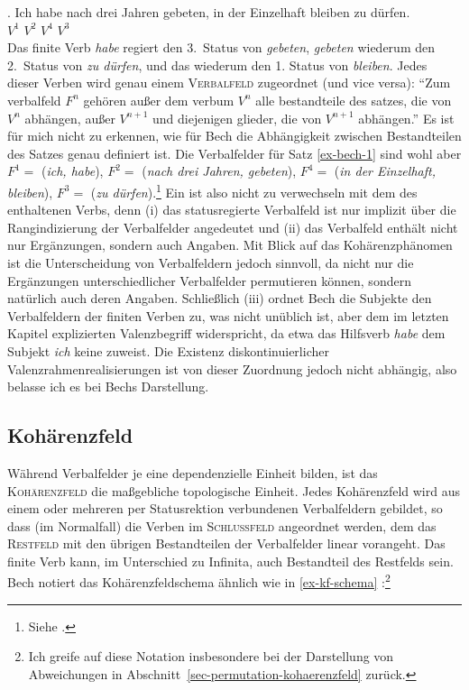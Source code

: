 \exg. Ich habe nach drei Jahren gebeten, in der Einzelhaft bleiben {zu dürfen}.\\
{} $V^1$ {} {} {} $V^2$ {} {} {} $V^4$ $V^3$\label{ex-bech-1}\\
 
Das finite Verb {\it habe} regiert den 3.~Status von {\it gebeten}, {\it gebeten} wiederum den 2.~Status von {\it zu dürfen}, und das wiederum den 1. Status von {\it bleiben}. Jedes dieser Verben wird genau einem \textsc{Verbalfeld} zugeordnet (und vice versa): "`Zum verbalfeld $F^n$ gehören au\ss er dem verbum $V^n$ alle bestandteile des satzes, die von $V^n$ abhängen, au\ss er $V^{n+1}$ und diejenigen glieder, die von $V^{n+1}$ abhängen."' \citep[\S 36]{Bech:55} Es ist für mich nicht zu erkennen, wie für Bech die Abhängigkeit zwischen Bestandteilen des Satzes genau definiert ist. Die Verbalfelder für Satz \ref{ex-bech-1} sind wohl aber $F^1 =$ ({\it ich, habe}), $F^2 =$ ({\it nach drei Jahren, gebeten}), $F^4 =$ ({\it in der Einzelhaft, bleiben}), $F^3 =$ ({\it zu dürfen}).\footnote{Siehe \citet[\S 22]{Bech:55}.} Ein  ist also nicht zu verwechseln mit dem  des enthaltenen Verbs, denn (i) das statusregierte Verbalfeld ist nur implizit über die Rangindizierung der Verbalfelder angedeutet und (ii) das Verbalfeld enthält nicht nur Ergänzungen, sondern auch Angaben. Mit Blick auf das Kohärenzphänomen ist die Unterscheidung von Verbalfeldern jedoch sinnvoll, da nicht nur die Ergänzungen unterschiedlicher Verbalfelder permutieren können, sondern natürlich auch deren Angaben. Schlie\ss lich (iii) ordnet Bech die Subjekte den Verbalfeldern der finiten Verben zu, was nicht unüblich ist, aber dem im letzten Kapitel explizierten Valenzbegriff widerspricht, da etwa das Hilfsverb {\it habe} dem Subjekt {\it ich} keine  zuweist. Die Existenz diskontinuierlicher Valenzrahmenrealisierungen ist von dieser Zuordnung jedoch nicht abhängig, also belasse ich es bei Bechs Darstellung.  

\subsection{Kohärenzfeld} 

Während Verbalfelder je eine dependenzielle Einheit bilden, ist das \textsc{Kohärenzfeld} die ma\ss gebliche topologische Einheit. Jedes Kohärenzfeld wird aus einem oder mehreren per Statusrektion verbundenen Verbalfeldern gebildet, so dass (im Normalfall) die Verben im \textsc{Schlussfeld} angeordnet werden, dem das \textsc{Restfeld} mit den übrigen Bestandteilen der Verbalfelder linear vorangeht. Das finite Verb kann, im Unterschied zu Infinita, auch Bestandteil des Restfelds sein. Bech notiert das Kohärenzfeldschema ähnlich wie in \ref{ex-kf-schema} \citep[\S 55]{Bech:55}:\footnote{Ich greife auf diese Notation insbesondere bei der Darstellung von Abweichungen in Abschnitt~\ref{sec-permutation-kohaerenzfeld} zurück.}  

